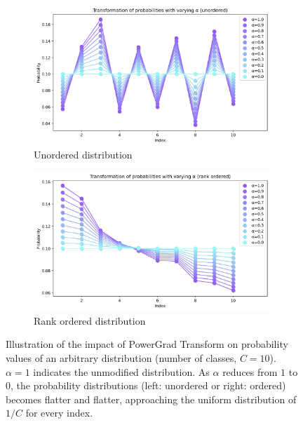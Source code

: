 \documentclass[runningheads]{llncs}
\begin{document}
\begin{figure}[t]
\centering
\begin{subfigure}{.5\textwidth}
\centering
\includegraphics[width=0.98\textwidth]{prob_transform_unordered}
\caption{Unordered distribution}
\end{subfigure}%
\begin{subfigure}{.5\textwidth}
\centering
\includegraphics[width=0.98\textwidth]{prob_transform_ordered}
\caption{Rank ordered distribution}
\end{subfigure}
\caption{ Illustration of the impact of PowerGrad Transform on probability values of an
arbitrary distribution (number of classes, $C=10$). $\alpha=1$ indicates the unmodified
distribution. As $\alpha$ reduces from $1$ to $0$, the probability distributions (left:
unordered or right: ordered) becomes flatter and flatter, approaching the uniform
distribution of $1/C$ for every index. }
\label{fig:prob_plots}
\vspace{-0.5cm}
\end{figure}
\end{document}
